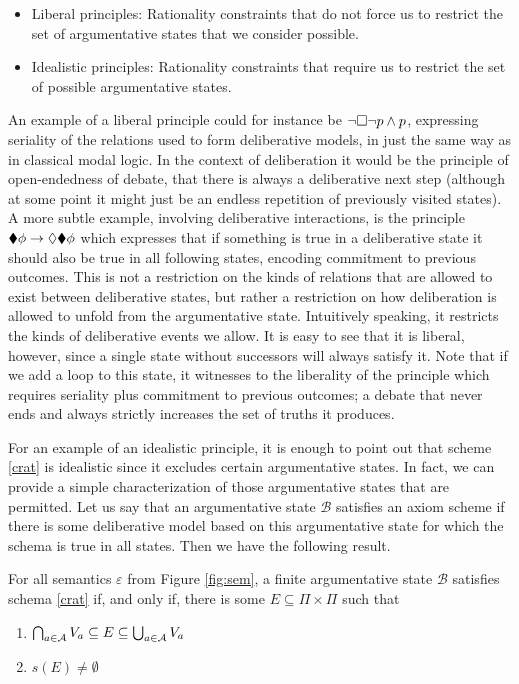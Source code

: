 \documentclass[greybox]{svmult}
\newcommand{\views}{\mathcal B}
\newcommand{\sem}{\varepsilon}
\begin{document}
\begin{itemize}
\item Liberal principles: Rationality constraints that do not force us to restrict the set of argumentative states that we consider possible. 
\item Idealistic principles: Rationality constraints that require us to restrict the set of possible argumentative states.
\end{itemize} 

An example of a liberal principle could for instance be $\neg \square \neg p \land p$, expressing seriality of the relations used to form deliberative models, in just the same way as in classical modal logic. In the context of deliberation it would be the principle of open-endedness of debate, that there is always a deliberative next step (although at some point it might just be an endless repetition of previously visited states). A more subtle example, involving deliberative interactions, is the principle $\blacklozenge \phi \to \lozenge \blacklozenge \phi$ which expresses that if something is true in a deliberative state it should also be true in all following states, encoding commitment to previous outcomes. This is not a restriction on the kinds of relations that are allowed to exist between deliberative states, but rather a restriction on how deliberation is allowed to unfold from the argumentative state. Intuitively speaking, it restricts the kinds of deliberative events we allow. It is easy to see that it is liberal, however, since a single state without successors will always satisfy it. Note that if we add a loop to this state, it witnesses to the liberality of the principle which requires seriality plus commitment to previous outcomes; a debate that never ends and always strictly increases the set of truths it produces.

For an example of an idealistic principle, it is enough to point out that scheme \ref{crat} is idealistic since it excludes certain argumentative states. In fact, we can provide a simple characterization of those argumentative states that are permitted. Let us say that an argumentative state $\views$ satisfies an axiom scheme if there is some deliberative model based on this argumentative state for which the schema is true in all states. Then we have the following result.

\begin{theorem}\label{thm:1}
For all semantics $\sem$ from Figure \ref{fig:sem}, a finite argumentative state $\views$ satisfies schema \ref{crat} if, and only if, there is some $E \subseteq \Pi \times \Pi$ such that
\begin{enumerate}
\item $\bigcap_{a \in \mathcal A}V_a \subseteq E \subseteq \bigcup_{a \in \mathcal A}V_a$
\item $s(E) \not = \emptyset$
\end{enumerate}
\end{theorem}
\end{document}
